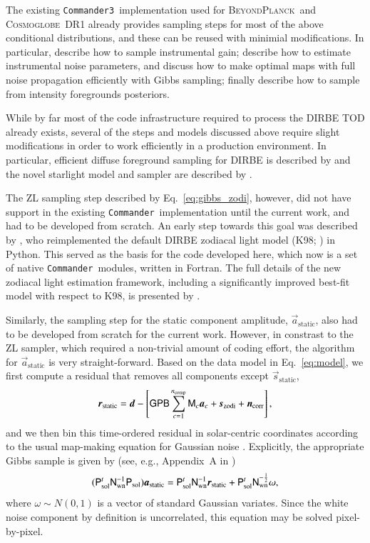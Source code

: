 \documentclass{aa}
\def\Cosmoglobe{\textsc{Cosmoglobe}}
\def\commanderthree{\texttt{Commander3}}
\def\commander{\texttt{Commander}}
\newcommand{\dv}[0]{\vec{d}}
\newcommand{\B}[0]{\tens{B}}
\newcommand{\G}[0]{\tens{G}}
\newcommand{\n}[0]{\vec{n}}
\newcommand{\s}[0]{\vec{s}}
\renewcommand{\a}[0]{\vec{a}}
\newcommand{\N}[0]{\tens{N}}
\newcommand{\M}[0]{\tens{M}}
\renewcommand{\r}[0]{\vec{r}}
\renewcommand{\P}[0]{\tens{P}}
\newcommand{\BP}{\textsc{BeyondPlanck}}
\begin{document}
The existing \commanderthree\ implementation used for \BP\ and
\Cosmoglobe\ DR1 already provides sampling steps for most of the above
conditional distributions, and these can be reused with minimial
modifications. In particular, \citet{bp07} describe how to sample
instrumental gain; \citet{bp06} describe how to estimate instrumental
noise parameters, and \citet{bp02} discuss how to make optimal maps
with full noise propagation efficiently with Gibbs sampling; finally
\citet{bp13} describe how to sample from intensity foregrounds
posteriors. 







While by far most of the code infrastructure required to process the
DIRBE TOD already exists, several of the steps and models discussed
above require slight modifications in order to work efficiently in a
production environment. In particular, efficient diffuse foreground
sampling for DIRBE is described by \citet{CG02_07} and the novel
starlight model and sampler are described by \citet{CG02_04}.

The ZL sampling step described by Eq.~\eqref{eq:gibbs_zodi}, however,
did not have support in the existing \commander\ implementation until
the current work, and had to be developed from scratch. An early step
towards this goal was described by \citet{san:2022}, who reimplemented
the default DIRBE zodiacal light model (K98; \citealp{kelsall1998}) in
Python. This served as the basis for the code developed here, which
now is a set of native \commander\ modules, written in Fortran. The
full details of the new zodiacal light estimation framework, including
a significantly improved best-fit model with respect to K98, is
presented by \citet{CG02_02}.

Similarly, the sampling step for the static component amplitude,
$\a_{\mathrm{static}}$, also had to be developed from scratch for the
current work. However, in constrast to the ZL sampler, which required
a non-trivial amount of coding effort, the algorithm for
$\a_{\mathrm{static}}$ is very straight-forward. Based on the data
model in Eq.~\eqref{eq:model}, we first compute a residual that
removes all components except $\s_{\mathrm{static}}$,
\begin{equation}
  \r_{\mathrm{static}} = \dv - \left[\G\P\B\sum_{c=1}^{n_{\mathrm{comp}}}\M_c\a_c+\s_{\mathrm{zodi}} 
    + \n_\mathrm{corr}\right],
\end{equation}
and we then bin this time-ordered residual in solar-centric coordinates
according to the usual map-making equation for Gaussian noise
\citep[e.g.,][]{tegmark_mapmaking}. Explicitly, the appropriate
Gibbs sample is given by (see, e.g., Appendix~A in \citealp{bp01})
\begin{equation}
(\P_{\mathrm{sol}}^t\N_{\mathrm{wn}}^{-1}\P_{\mathrm{sol}})\a_{\mathrm{static}} 
  = \P_{\mathrm{sol}}^t\N_{\mathrm{wn}}^{-1}\r_{\mathrm{static}} + \P_{\mathrm{sol}}^t\N_{\mathrm{wn}}^{-\frac{1}{2}}\omega,
\end{equation}
where $\omega\sim N(0,1)$ is a vector of standard Gaussian
variates. Since the white noise component by definition is
uncorrelated, this equation may be solved pixel-by-pixel.
\end{document}
